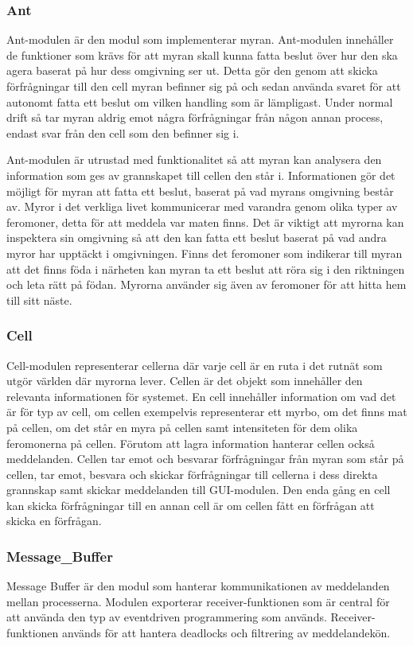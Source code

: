 \documentclass[12pt]{article}
\begin{document}
\subsubsection{Ant}
Ant-modulen är den modul som implementerar myran.
Ant-modulen innehåller de funktioner som krävs för att myran skall kunna fatta beslut över hur den ska agera baserat på hur dess omgivning ser ut.
Detta gör den genom att skicka förfrågningar till den cell myran befinner sig på och sedan använda svaret för att autonomt fatta ett beslut om vilken handling som är lämpligast.
Under normal drift så tar myran aldrig emot några förfrågningar från någon annan process,
endast svar från den cell som den befinner sig i.

Ant-modulen är utrustad med funktionalitet så att myran kan analysera den information som ges av grannskapet till cellen den står i.
Informationen gör det möjligt för myran att fatta ett beslut,
baserat på vad myrans omgivning består av.
Myror i det verkliga livet kommunicerar med varandra genom olika typer av feromoner,
detta för att meddela var maten finns.
Det är viktigt att myrorna kan inspektera sin omgivning så att den kan fatta ett beslut baserat på vad andra myror har upptäckt i omgivningen.
Finns det feromoner som indikerar till myran att det finns föda i närheten kan myran ta ett beslut att röra sig i den riktningen och leta rätt på födan.
Myrorna använder sig även av feromoner för att hitta hem till sitt näste.

\subsubsection{Cell}
Cell-modulen representerar cellerna där varje cell är en ruta i det rutnät som utgör världen där myrorna lever.
Cellen är det objekt som innehåller den relevanta informationen för systemet.
En cell innehåller information om vad det är för typ av cell,
om cellen exempelvis representerar ett myrbo, 
om det finns mat på cellen,
om det står en myra på cellen 
samt intensiteten för dem olika feromonerna på cellen.
Förutom att lagra information hanterar cellen också meddelanden.
Cellen tar emot och besvarar förfrågningar från myran som står på cellen, tar emot, besvara och skickar förfrågningar till cellerna i dess direkta grannskap samt skickar meddelanden till GUI-modulen.
Den enda gång en cell kan skicka förfrågningar till en annan cell är om cellen fått en förfrågan att skicka en förfrågan.

\subsubsection{Message\_Buffer}
Message Buffer är den modul som hanterar kommunikationen av meddelanden mellan processerna.
Modulen exporterar receiver-funktionen som är central för att använda den typ av eventdriven programmering som används.
Receiver-funktionen används för att hantera deadlocks och filtrering av meddelandekön.
\end{document}
